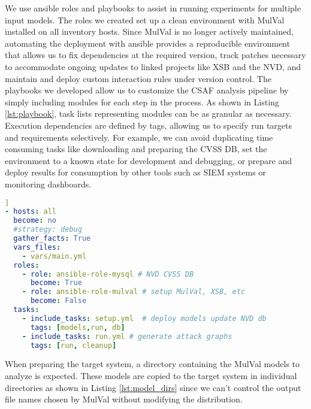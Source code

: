 We use ansible\cite{Hall:2013:ACM:2601666} roles and playbooks to assist in running experiments for multiple input models. The roles we created set up a clean environment with MulVal installed on all inventory hosts. Since MulVal is no longer actively maintained, automating the deployment with ansible provides a reproducible environment that allows us to fix dependencies at the required version, track patches necessary to accommodate ongoing updates to linked projects like XSB and the NVD, and maintain and deploy custom interaction rules under version control. The playbooks we developed allow us to customize the CSAF analysis pipeline by simply including modules for each step in the process. As shown in Listing \ref{lst:playbook}, task lists representing modules can be as granular as necessary. Execution dependencies are defined by tags, allowing us to specify run targets and requirements selectively. For example, we can avoid duplicating time consuming tasks like downloading and preparing the CVSS DB, set the environment to a known state for development and debugging, or prepare and deploy results for consumption by other tools such as SIEM systems or monitoring dashboards. 


\begin{lstlisting}[language=yaml, label={lst:playbook}, caption={Ansible CSAF play},captionpos=b,  linewidth=.45\textwidth, xleftmargin=20pt]]
- hosts: all
  become: no
  #strategy: debug
  gather_facts: True
  vars_files:
    - vars/main.yml
  roles:
    - role: ansible-role-mysql # NVD CVSS DB
      become: True
    - role: ansible-role-mulval # setup MulVal, XSB, etc
      become: False
  tasks:
    - include_tasks: setup.yml  # deploy models update NVD db
      tags: [models,run, db]
    - include_tasks: run.yml # generate attack graphs
      tags: [run, cleanup]
\end{lstlisting}

When preparing the target system, a directory containing the MulVal models to analyze is expected. These models are copied to the target system in individual directories as shown in Listing \ref{lst:model_dirs} since we can't control the output file names chosen by MulVal without modifying the distribution. 

